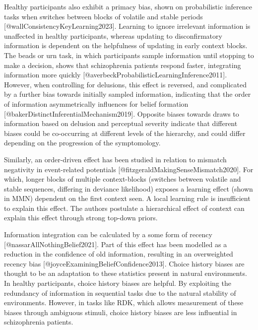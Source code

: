 \documentclass{article}
\begin{document}
Healthy participants also exhibit a primacy bias, shown on probabilistic inference tasks when switches between blocks of volatile and stable periods [@wallConsistencyKeyLearning2023]. Learning to ignore irrelevant information is unaffected in healthy participants, whereas updating to disconfirmatory information is dependent on the helpfulness of updating in early context blocks. The beads or urn task, in which participants sample information until stopping to make a decision, shows that schizophrenia patients respond faster, integrating information more quickly [@averbeckProbabilisticLearningInference2011]. However, when controlling for delusions, this effect is reversed, and complicated by a further bias towards initially sampled information, indicating that the order of information asymmetrically influences for belief formation [@bakerDistinctInferentialMechanism2019]. Opposite biases towards draws to information based on delusion and perceptual severity indicate that different biases could be co-occurring at different levels of the hierarchy, and could differ depending on the progression of the symptomology.

Similarly, an order-driven effect has been studied in relation to mismatch negativity in event-related potentials [@fitzgeraldMakingSenseMismatch2020]. For which, longer blocks of multiple context-blocks (switches between volatile and stable sequences, differing in deviance likelihood) exposes a learning effect (shown in MMN) dependent on the first context seen. A local learning rule is insufficient to explain this effect. The authors postulate a hierarchical effect of context can explain this effect through strong top-down priors.

Information integration can be calculated by a some form of recency [@nassarAllNothingBelief2021]. Part of this effect has been modelled as a reduction in the confidence of old information, resulting in an overweighted recency bias [@joyceExaminingBeliefConfidence2013]. Choice history biases are thought to be an adaptation to these statistics present in natural environments. In healthy participants, choice history biases are helpful. By exploiting the redundancy of information in sequential tasks due to the natural stability of environments. However, in tasks like RDK, which allows measurement of these biases through ambiguous stimuli, choice history biases are less influential in schizophrenia patients.
\end{document}

